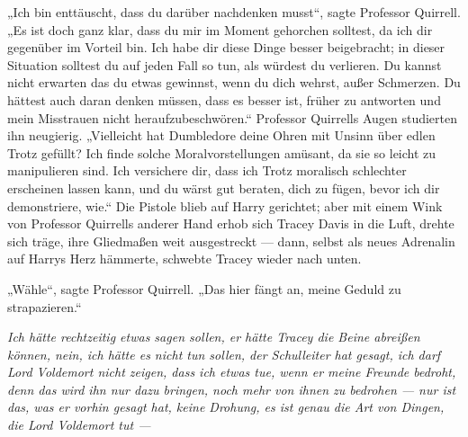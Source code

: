 „Ich bin enttäuscht, dass du darüber nachdenken musst“, sagte Professor Quirrell.
„Es ist doch ganz klar, dass du mir im Moment gehorchen solltest, da ich dir gegenüber im Vorteil bin. Ich habe dir diese Dinge besser beigebracht; in dieser Situation solltest du auf jeden Fall so tun, als würdest du verlieren. Du kannst nicht erwarten das du etwas gewinnst, wenn du dich wehrst, außer Schmerzen. Du hättest auch daran denken müssen, dass es besser ist, früher zu antworten und mein Misstrauen nicht heraufzubeschwören.“
Professor Quirrells Augen studierten ihn neugierig.
„Vielleicht hat Dumbledore deine Ohren mit Unsinn über edlen Trotz gefüllt? Ich finde solche Moralvorstellungen amüsant, da sie so leicht zu manipulieren sind. Ich versichere dir, dass ich Trotz moralisch schlechter erscheinen lassen kann, und du wärst gut beraten, dich zu fügen, bevor ich dir demonstriere, wie.“
Die Pistole blieb auf Harry gerichtet; aber mit einem Wink von Professor Quirrells anderer Hand erhob sich Tracey Davis in die Luft, drehte sich träge, ihre Gliedmaßen weit ausgestreckt —
dann, selbst als neues Adrenalin auf Harrys Herz hämmerte, schwebte Tracey wieder nach unten.

„Wähle“, sagte Professor Quirrell.
„Das hier fängt an, meine Geduld zu strapazieren.“

\emph{Ich hätte rechtzeitig etwas sagen sollen, er hätte Tracey die Beine abreißen können, nein, ich hätte es nicht tun sollen, der Schulleiter hat gesagt, ich darf Lord Voldemort nicht zeigen, dass ich etwas tue, wenn er meine Freunde bedroht, denn das wird ihn nur dazu bringen, noch mehr von ihnen zu bedrohen — nur ist das, was er vorhin gesagt hat, keine \emph{Drohung}, es ist genau die Art von Dingen, die Lord Voldemort \emph{tut} —}

